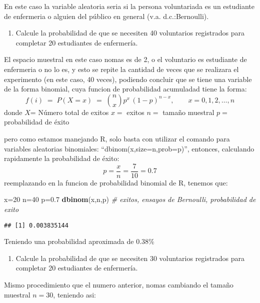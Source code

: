 \documentclass[
]{article}
\newenvironment{Shaded}{\begin{snugshade}}{\end{snugshade}}
\newcommand{\CommentTok}[1]{\textcolor[rgb]{0.56,0.35,0.01}{\textit{#1}}}
\newcommand{\DecValTok}[1]{\textcolor[rgb]{0.00,0.00,0.81}{#1}}
\newcommand{\FloatTok}[1]{\textcolor[rgb]{0.00,0.00,0.81}{#1}}
\newcommand{\FunctionTok}[1]{\textcolor[rgb]{0.13,0.29,0.53}{\textbf{#1}}}
\newcommand{\NormalTok}[1]{#1}
\newcommand{\OtherTok}[1]{\textcolor[rgb]{0.56,0.35,0.01}{#1}}
\providecommand{\tightlist}{%
  \setlength{\itemsep}{0pt}\setlength{\parskip}{0pt}}
\begin{document}
En este caso la variable aleatoria seria si la persona voluntariada es
un estudiante de enfermeria o alguien del público en general (v.a.
d.c.:Bernoulli).

\begin{enumerate}
\def\labelenumi{\arabic{enumi}.}
\tightlist
\item
  Calcule la probabilidad de que se necesiten 40 voluntarios registrados
  para completar 20 estudiantes de enfermería.
\end{enumerate}

El espacio muestral en este caso nomas es de 2, o el voluntario es
estudiante de enfermeria o no lo es, y esto se repite la cantidad de
veces que se realizara el experimento (en este caso, 40 veces), podiendo
concluir que se tiene una variable de la forma binomial, cuya funcion de
probabilidad acumuladad tiene la forma:
\[f(i) \;=\; P(X=x)  \;=\; {n\choose x} p^x\, (1-p)^{n-x}, \qquad x=0,1,2, \ldots, n\]
donde \(X\)= Número total de exitos \(x=\) exitos \(n=\) tamaño muestral
\(p=\) probabilidad de éxito

pero como estamos manejando R, solo basta con utilizar el comando para
variables aleatorias binomiales: ``dbinom(x,size=n,prob=p)'', entonces,
calculando rapidamente la probabilidad de éxito:
\[p=\frac{x}{n}=\frac{7}{10}=0.7\] reemplazando en la funcion de
probabilidad binomial de R, tenemos que:

\begin{Shaded}
\begin{Highlighting}[]
\NormalTok{x}\OtherTok{=}\DecValTok{20}
\NormalTok{n}\OtherTok{=}\DecValTok{40}
\NormalTok{p}\OtherTok{=}\FloatTok{0.7}
\FunctionTok{dbinom}\NormalTok{(x,n,p) }\CommentTok{\# exitos, ensayos de Bernoulli, probabilidad de exito}
\end{Highlighting}
\end{Shaded}

\begin{verbatim}
## [1] 0.003835144
\end{verbatim}

Teniendo una probabilidad aproximada de 0.38\%

\begin{enumerate}
\def\labelenumi{\arabic{enumi}.}
\setcounter{enumi}{1}
\tightlist
\item
  Calcule la probabilidad de que se necesiten 30 voluntarios registrados
  para completar 20 estudiantes de enfermería.
\end{enumerate}

Mismo procedimiento que el numero anterior, nomas cambiando el tamaño
muestral \(n=30\), teniendo asi:
\end{document}
